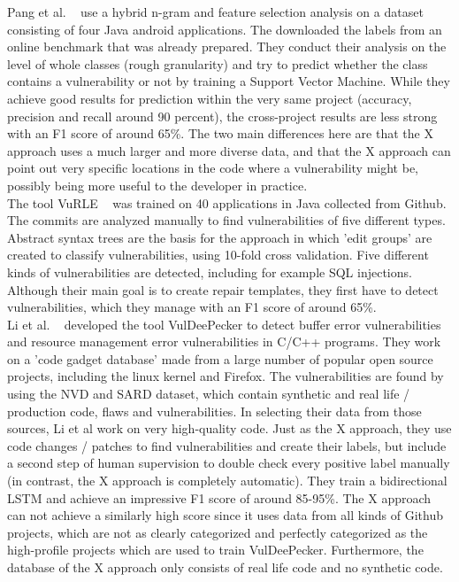 \documentclass[
	a4paper,
	pagesize,
	pdftex,
	12pt,
	twoside, %
	BCOR=5mm, %
	ngerman,
	fleqn,
	final,
	]{scrartcl}
\begin{document}
Pang et al. ~\cite{Pang.2015} use a hybrid n-gram and feature selection analysis on a dataset consisting of four Java android applications. The downloaded the labels from an online benchmark that was already prepared. They conduct their analysis on the level of whole classes (rough granularity) and try to predict whether the class contains a vulnerability or not by training a Support Vector Machine. While they achieve good results for prediction within the very same project (accuracy, precision and recall around 90 percent), the cross-project results are less strong with an F1 score of around 65\%. The two main differences here are that the X approach uses a much larger and more diverse data, and that the X approach can point out very specific locations in the code where a vulnerability might be, possibly being more useful to the developer in practice.\\

The tool VuRLE ~\cite{Ma.2017} was trained on 40 applications in Java collected from Github. The commits are analyzed manually to find vulnerabilities of five different types. Abstract syntax trees are the basis for the approach in which 'edit groups' are created to classify vulnerabilities, using 10-fold cross validation. Five different kinds of vulnerabilities are detected, including for example SQL injections. Although their main goal is to create repair templates, they first have to detect vulnerabilities, which they manage with an F1 score of around 65\%. \\

Li et al. ~\cite{Li.2018} developed the tool VulDeePecker to detect buffer error vulnerabilities and resource management error vulnerabilities in C/C++ programs. They work on a 'code gadget database' made from a large number of popular open source projects, including the linux kernel and Firefox. The vulnerabilities are found by using the NVD and SARD dataset, which contain synthetic and real life / production code, flaws and vulnerabilities. In selecting their data from those sources, Li et al work on very high-quality code. Just as the X approach, they use code changes / patches to find vulnerabilities and create their labels, but include a second step of human supervision to double check every positive label manually (in contrast, the X approach is completely automatic). They train a bidirectional LSTM and achieve an impressive F1 score of around 85-95\%. The X approach can not achieve a similarly high score since it uses data from all kinds of Github projects, which are not as clearly categorized and perfectly categorized as the high-profile projects which are used to train VulDeePecker. Furthermore, the database of the X approach only consists of real life code and no synthetic code.\\
\end{document}
